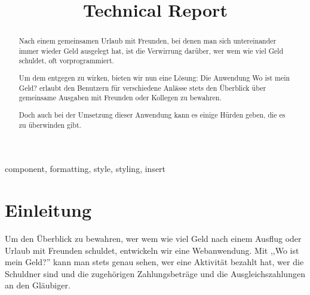 \documentclass[conference]{IEEEtran}
\begin{document}
\title{Technical Report}

\author{
    \and
    \and
    \and
    \and
    \and
    \and
}

\maketitle

\begin{abstract}
    Nach einem gemeinsamen Urlaub mit Freunden, bei denen man sich untereinander
    immer wieder Geld ausgelegt hat, ist die Verwirrung darüber,
    wer wem wie viel Geld schuldet, oft vorprogrammiert.

    Um dem entgegen zu wirken, bieten wir nun eine Lösung: Die Anwendung
    \glqq Wo ist mein Geld?\grqq{} erlaubt den Benutzern für verschiedene Anlässe stets
    den Überblick über gemeinsame Ausgaben mit Freunden oder Kollegen zu
    bewahren.

    Doch auch bei der Umsetzung dieser Anwendung kann es einige Hürden geben, die es zu überwinden gibt.
\end{abstract}

\begin{IEEEkeywords}
    component, formatting, style, styling, insert
\end{IEEEkeywords}

\section{Einleitung}
Um den Überblick zu bewahren, wer wem wie viel Geld nach einem Ausflug oder Urlaub mit Freunden schuldet,
entwickeln wir eine Webanwendung. Mit ,,Wo ist mein Geld?'' kann man stets genau sehen, wer eine Aktivität bezahlt hat,
wer die Schuldner sind und die zugehörigen Zahlungsbeträge und die Ausgleichszahlungen an den \gls{Gläubiger}.
\end{document}
